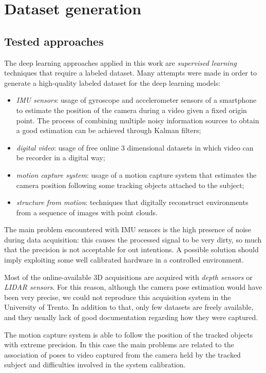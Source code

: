 \section{Dataset generation}
\subsection{Tested approaches}
The deep learning approaches applied in this work are \emph{supervised learning} techniques that require a labeled dataset. Many attempts were made in order to generate a high-quality labeled dataset for the deep learning models:
\begin{itemize}
    \item \emph{IMU sensors}: usage of gyroscope and accelerometer sensors of a smartphone to estimate the position of the camera during a video given a fixed origin point. The process of combining multiple noisy information sources to obtain a good estimation can be achieved through Kalman filters;
    \item \emph{digital video}: usage of free online 3 dimensional datasets in which video can be recorder in a digital way;
    \item \emph{motion capture system}: usage of a motion capture system that estimates the camera position following some tracking objects attached to the subject;
    \item \emph{structure from motion}: techniques that digitally reconstruct environments from a sequence of images with point clouds.
\end{itemize}

The main problem encountered with IMU sensors is the high presence of noise during data acquisition: this causes the processed signal to be very dirty, so much that the precision is not acceptable for out intentions. A possible solution should imply exploiting some well calibrated hardware in a controlled environment.

Most of the online-available 3D acquisitions are acquired with \emph{depth sensors} or \emph{LIDAR sensors}. For this reason, although the camera pose estimation would have been very precise, we could not reproduce this acquisition system in the University of Trento. In addition to that, only few datasets are freely available, and they usually lack of good documentation regarding how they were captured.

The motion capture system is able to follow the position of the tracked objects with extreme precision. In this case the main problems are related to the association of poses to video captured from the camera held by the tracked subject and difficulties involved in the system calibration.

